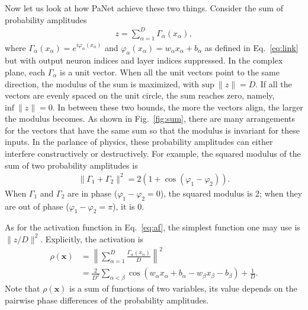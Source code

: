 \documentclass{article}
\begin{document}
Now let us look at how PaNet achieve these two things. Consider the sum of
probability amplitudes
\begin{align}
  \label{eq:summation}
  z = \sum_{\alpha=1}^{D}\Gamma_{\alpha}(x_{\alpha}),
\end{align}
where \(\Gamma_{\alpha}(x_{\alpha}) = e^{i\varphi_{\alpha}(x_{\alpha})}\)
and \(\varphi_{\alpha}(x_{\alpha}) = w_{\alpha}x_{\alpha} + b_{\alpha}\) as
defined in Eq.~\ref{eq:link} but with output neuron indices and layer
indices suppressed. In the complex plane, each \(\Gamma_{\alpha}\) is a unit
vector. When all the unit vectors point to the same direction, the modulus
of the sum is maximized, with \(\mathrm{sup}\ \|z\| = D\). If all the
vectors are evenly spaced on the unit circle, the sum reaches zero, namely,
\(\mathrm{inf}\ \|z\| = 0\). In between these two bounds, the more the
vectors align, the larger the modulus becomes. As shown in
Fig.~\ref{fig:sum}, there are many arrangements for the vectors that have
the same sum so that the modulus is invariant for these inputs. In the
parlance of physics, these probability amplitudes can either interfere
constructively or destructively. For example, the squared modulus of the sum
of two probability amplitudes is
\begin{align*}
\|\Gamma_{1}+ \Gamma_{2}\|^{2} = 2(1 + \cos(\varphi_{1} - \varphi_{2})).
\end{align*}
When \(\Gamma_{1}\) and \(\Gamma_{2}\) are in phase
(\(\varphi_{1} - \varphi_{2} = 0\)), the squared modulus is 2; when they are
out of phase (\(\varphi_{1} - \varphi_{2} = \pi\)), it is 0.

As for the activation function in Eq.~\ref{eq:af}, the simplest function one
may use is \(\|z/D\|^{2}\). Explicitly, the activation is
\begin{align}
  \label{eq:smod}
  \rho(\mathbf{x}) &= \left\|\sum_{\alpha=1}^{D}\frac{\Gamma_{\alpha}(x_{\alpha})}{D}\right\|^{2} \nonumber \\
                   &= \frac{2}{D^{2}}\sum_{\alpha < \beta}\cos(w_{\alpha}x_{\alpha} + b_{\alpha} - w_{\beta}x_{\beta} - b_{\beta}) + \frac{1}{D}.
\end{align}
Note that \(\rho(\mathbf{x})\) is a sum of functions of two variables, its
value depends on the pairwise phase differences of the probability
amplitudes. 
\end{document}
